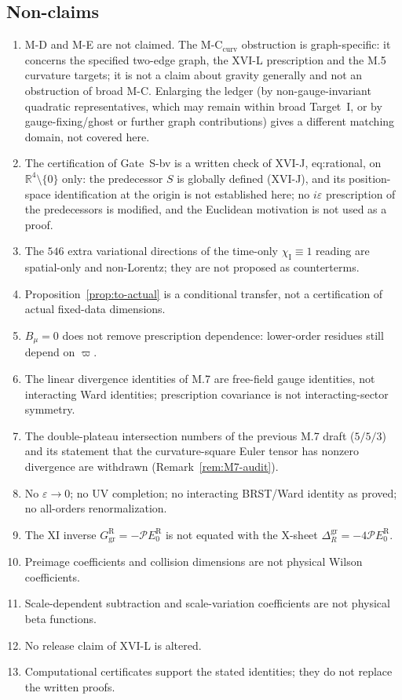 \documentclass{article}
\theoremstyle{remark}
\newcommand{\Pc}{\mathcal P}
\newcommand{\chiI}{\chi_{\mathrm I}}
\begin{document}
\subsection{Non-claims}
\begin{enumerate}
\item M-D and M-E are not claimed. The M-C$_{\mathrm{curv}}$ obstruction is graph-specific: it concerns the specified two-edge graph, the XVI-L prescription and the M.5 curvature targets; it is not a claim about gravity generally and not an obstruction of broad M-C. Enlarging the ledger (by non-gauge-invariant quadratic representatives, which may remain within broad Target~I, or by gauge-fixing/ghost or further graph contributions) gives a different matching domain, not covered here.
\item The certification of Gate~S-bv is a written check of XVI-J, eq:rational, on $\mathbb R^4\setminus\{0\}$ only: the predecessor $S$ is globally defined (XVI-J), and its position-space identification at the origin is not established here; no $i\varepsilon$ prescription of the predecessors is modified, and the Euclidean motivation is not used as a proof.
\item The $546$ extra variational directions of the time-only $\chiI\equiv1$ reading are spatial-only and non-Lorentz; they are not proposed as counterterms.
\item Proposition~\ref{prop:to-actual} is a conditional transfer, not a certification of actual fixed-data dimensions.
\item $B_\mu=0$ does not remove prescription dependence: lower-order residues still depend on $\varpi$.
\item The linear divergence identities of M.7 are free-field gauge identities, not interacting Ward identities; prescription covariance is not interacting-sector symmetry.
\item The double-plateau intersection numbers of the previous M.7 draft ($5/5/3$) and its statement that the curvature-square Euler tensor has nonzero divergence are withdrawn (Remark~\ref{rem:M7-audit}).
\item No $\varepsilon\to0$; no UV completion; no interacting BRST/Ward identity as proved; no all-orders renormalization.
\item The XI inverse $G_{\mathrm{gr}}^{\mathrm R}=-\Pc E_0^{\mathrm R}$ is not equated with the X-sheet $\Delta_R^{\mathrm{gr}}=-4\Pc E_0^{\mathrm R}$.
\item Preimage coefficients and collision dimensions are not physical Wilson coefficients.
\item Scale-dependent subtraction and scale-variation coefficients are not physical beta functions.
\item No release claim of XVI-L is altered.
\item Computational certificates support the stated identities; they do not replace the written proofs.
\end{enumerate}
\end{document}
